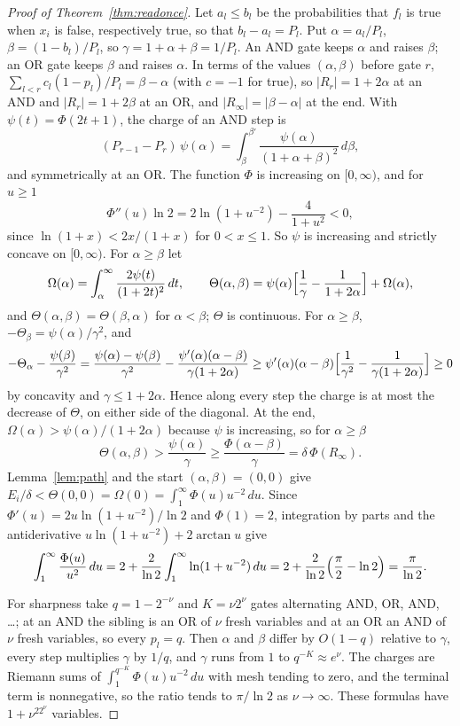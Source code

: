 \documentclass[11pt]{amsart}
\theoremstyle{definition}
\theoremstyle{remark}
\begin{document}
\begin{proof}[Proof of Theorem~\ref{thm:readonce}]
Let $a_l\le b_l$ be the probabilities that $f_l$ is true when $x_i$ is false, respectively true, so that
$b_l-a_l=P_l$. Put $\alpha=a_l/P_l$, $\beta=(1-b_l)/P_l$, so $\gamma=1+\alpha+\beta=1/P_l$. An AND gate keeps $\alpha$ and raises
$\beta$; an OR gate keeps $\beta$ and raises $\alpha$. In terms of the values $(\alpha,\beta)$ before gate $r$,
$\sum_{l<r}c_l(1-p_l)/P_l=\beta-\alpha$ (with $c=-1$ for true), so $|R_r|=1+2\alpha$ at an AND and $|R_r|=1+2\beta$ at an
OR, and $|R_\infty|=|\beta-\alpha|$ at the end. With $\psi(t)=\Phi(2t+1)$, the charge of an AND step is
\[
(P_{r-1}-P_r)\,\psi(\alpha)=\int_{\beta}^{\beta'}\frac{\psi(\alpha)}{(1+\alpha+\beta)^2}\,d\beta ,
\]
and symmetrically at an OR. The function $\Phi$ is increasing on $[0,\infty)$, and for $u\ge1$
\[
\Phi''(u)\ln2=2\ln(1+u^{-2})-\frac{4}{1+u^2}<0,
\]
since $\ln(1+x)<2x/(1+x)$ for $0<x\le1$. So $\psi$ is increasing and strictly concave on $[0,\infty)$. For $\alpha\ge\beta$ let
\[
\Omega(\alpha)=\int_\alpha^\infty\frac{2\psi(t)}{(1+2t)^2}\,dt,\qquad
\Theta(\alpha,\beta)=\psi(\alpha)\Bigl[\frac1\gamma-\frac1{1+2\alpha}\Bigr]+\Omega(\alpha),
\]
and $\Theta(\alpha,\beta)=\Theta(\beta,\alpha)$ for $\alpha<\beta$; $\Theta$ is continuous. For $\alpha\ge\beta$, $-\Theta_\beta=\psi(\alpha)/\gamma^2$, and
\[
-\Theta_\alpha-\frac{\psi(\beta)}{\gamma^2}=\frac{\psi(\alpha)-\psi(\beta)}{\gamma^2}-\frac{\psi'(\alpha)(\alpha-\beta)}{\gamma(1+2\alpha)}
\ge \psi'(\alpha)(\alpha-\beta)\Bigl[\frac1{\gamma^2}-\frac1{\gamma(1+2\alpha)}\Bigr]\ge0
\]
by concavity and $\gamma\le1+2\alpha$. Hence along every step the charge is at most the decrease of $\Theta$, on either side of
the diagonal. At the end, $\Omega(\alpha)>\psi(\alpha)/(1+2\alpha)$ because $\psi$ is increasing, so for $\alpha\ge\beta$
\[
\Theta(\alpha,\beta)>\frac{\psi(\alpha)}{\gamma}\ge\frac{\Phi(\alpha-\beta)}{\gamma}=\delta\,\Phi(R_\infty).
\]
Lemma~\ref{lem:path} and the start $(\alpha,\beta)=(0,0)$ give $E_i/\delta<\Theta(0,0)=\Omega(0)=\int_1^\infty\Phi(u)u^{-2}\,du$.
Since $\Phi'(u)=2u\ln(1+u^{-2})/\ln2$ and $\Phi(1)=2$, integration by parts and the antiderivative
$u\ln(1+u^{-2})+2\arctan u$ give
\[
\int_1^\infty\frac{\Phi(u)}{u^2}\,du=2+\frac{2}{\ln 2}\int_1^\infty\ln(1+u^{-2})\,du=2+\frac2{\ln2}\Bigl(\frac\pi2-\ln2\Bigr)
=\frac{\pi}{\ln2}.
\]

For sharpness take $q=1-2^{-\nu}$ and $K=\nu2^\nu$ gates alternating AND, OR, AND, \dots; at an AND the sibling is an OR of
$\nu$ fresh variables and at an OR an AND of $\nu$ fresh variables, so every $p_l=q$. Then $\alpha$ and $\beta$ differ by
$O(1-q)$ relative to $\gamma$, every step multiplies $\gamma$ by $1/q$, and $\gamma$ runs from $1$ to $q^{-K}\approx e^\nu$. The
charges are Riemann sums of $\int_1^{q^{-K}}\Phi(u)u^{-2}\,du$ with mesh tending to zero, and the terminal term is
nonnegative, so the ratio tends to $\pi/\ln2$ as $\nu\to\infty$. These formulas have $1+\nu^22^\nu$ variables.
\end{proof}
\end{document}
